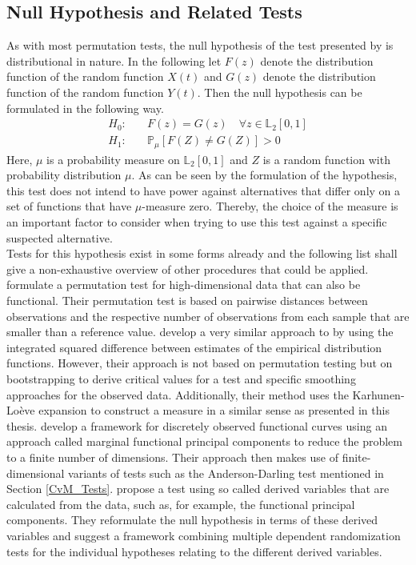 \documentclass[12pt, a4paper]{article}
\theoremstyle{MAstyle} \newtheorem{assumption}{Assumption}[section]
\theoremstyle{MAstyle} \newtheorem{definition}{Definition}[section]
\theoremstyle{MAstyle} \newtheorem{theorem}{Theorem}[section]
\begin{document}
		\subsection{Null Hypothesis and Related Tests}
			As with most permutation tests, the null hypothesis of the test presented by \cite{bugni_permutation_2021} is distributional in nature. In the following let $F(z)$ denote the distribution function of the random function $X(t)$ and $G(z)$ denote the distribution function of the random function $Y(t)$. Then the null hypothesis can be formulated in the following way.
			\begin{equation}
				\begin{split}
					H_0: \quad &F(z) = G(z) \quad \forall z \in \mathbb{L}_2[0,1] \\
					H_1: \quad &\mathbb{P}_{\mu}\left[F(Z) \neq G(Z)\right] > 0
				\end{split}
			\end{equation}
			Here, $\mu$ is a probability measure on $\mathbb{L}_2[0,1]$ and $Z$ is a random function with probability distribution $\mu$. As can be seen by the formulation of the hypothesis, this test does not intend to have power against alternatives that differ only on a set of functions that have $\mu$-measure zero. Thereby, the choice of the measure is an important factor to consider when trying to use this test against a specific suspected alternative. \\
			
			Tests for this hypothesis exist in some forms already and the following list shall give a non-exhaustive overview of other procedures that could be applied. \cite{hall_permutation_2002} formulate a permutation test for high-dimensional data that can also be functional. Their permutation test is based on pairwise distances between observations and the respective number of observations from each sample that are smaller than a reference value. 			
			\cite{hall_two-sample_2007} develop a very similar approach to \cite{bugni_permutation_2021}by using the integrated squared difference between estimates of the empirical distribution functions. However, their approach is not based on permutation testing but on bootstrapping to derive critical values for a test and specific smoothing approaches for the observed data. Additionally, their method uses the Karhunen-Lo\`{e}ve expansion to construct a measure in a similar sense as presented in this thesis.
			\cite{pomann_two-sample_2016} develop a framework for discretely observed functional curves using an approach called marginal functional principal components to reduce the problem to a finite number of dimensions. Their approach then makes use of finite-dimensional variants of tests such as the Anderson-Darling test mentioned in Section \ref{CvM_Tests}.
			\cite{corain_new_2014} propose a test using so called derived variables that are calculated from the data, such as, for example, the functional principal components. They reformulate the null hypothesis in terms of these derived variables and suggest a framework combining multiple dependent randomization tests for the individual hypotheses relating to the different derived variables.
			
\end{document}
